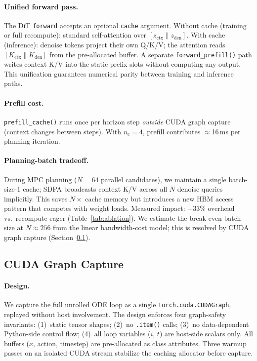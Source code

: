 \documentclass[letterpaper,twocolumn,10pt]{article}
\begin{document}
\paragraph{Unified forward pass.}
The DiT \texttt{forward} accepts an optional \texttt{cache}
argument.  Without cache (training or full recompute): standard
self-attention over $[z_\text{ctx} \| z_\text{den}]$.  With cache
(inference): denoise tokens project their own Q/K/V; the attention
reads $[K_\text{ctx} \| K_\text{den}]$ from the pre-allocated buffer.
A separate \texttt{forward\_prefill()} path writes context K/V into
the static prefix slots without computing any output.  This
unification guarantees numerical parity between training and inference
paths.

\paragraph{Prefill cost.}
\texttt{prefill\_cache()} runs once per horizon step \emph{outside}
CUDA graph capture (context changes between steps).  With $n_c{=}4$,
prefill contributes $\approx$16\,ms per planning iteration.

\paragraph{Planning-batch tradeoff.}
During MPC planning ($N{=}64$ parallel candidates), we maintain a
single batch-size-1 cache; SDPA broadcasts context K/V across all $N$
denoise queries implicitly.  This saves $N{\times}$ cache memory but
introduces a new HBM access pattern that competes with weight loads.
Measured impact: +33\% overhead vs.\
recompute eager (Table~\ref{tab:ablation}).  We estimate the
break-even batch size at $N{\approx}256$ from the linear
bandwidth-cost model; this is resolved by CUDA graph capture
(Section~\ref{sec:cudagraph}).

\subsection{CUDA Graph Capture}
\label{sec:cudagraph}

\paragraph{Design.}
We capture the full unrolled ODE loop as a single
\texttt{torch.cuda.CUDAGraph}, replayed without host involvement.
The design enforces four graph-safety invariants:
(1)~static tensor shapes; (2)~no \texttt{.item()} calls;
(3)~no data-dependent Python-side control flow;
(4)~all loop variables ($i$, $t$) are host-side scalars only.
All buffers ($x$, action, timestep) are pre-allocated as class
attributes.  Three warmup passes on an isolated CUDA stream stabilize
the caching allocator before capture.
\end{document}
